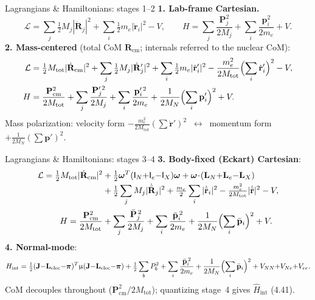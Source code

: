 \documentclass[aspectratio=169,10pt]{beamer}
\newcommand{\Mmu}{\upmu}        %
\newcommand{\stagenum}{0}
\newcommand{\setstage}[1]{\renewcommand{\stagenum}{#1}}
\begin{document}
\begin{frame}{Lagrangians \& Hamiltonians: stages 1--2}
\setstage{4}
\small
\textbf{1. Lab-frame Cartesian.}
\begin{equation*}
\mathcal L=\sum_j\tfrac12 M_j|\dot{\mathbf R}_j|^2+\sum_i\tfrac12 m_e|\dot{\mathbf r}_i|^2-V,
\qquad
H=\sum_j\frac{\mathbf P_j^2}{2M_j}+\sum_i\frac{\mathbf p_i^2}{2m_e}+V .
\end{equation*}
\textbf{2. Mass-centered} (total CoM $\mathbf R_{\mathrm{cm}}$; internals referred to the nuclear CoM):
\begin{align*}
\mathcal L&=\tfrac12 M_{\mathrm{tot}}|\dot{\mathbf R}_{\mathrm{cm}}|^2+\sum_j\tfrac12 M_j|\dot{\mathbf R}'_j|^2+\sum_i\tfrac12 m_e|\dot{\mathbf r}'_i|^2-\frac{m_e^2}{2M_{\mathrm{tot}}}\Bigl(\sum_i\dot{\mathbf r}'_i\Bigr)^2-V,\\
H&=\frac{\mathbf P_{\mathrm{cm}}^2}{2M_{\mathrm{tot}}}+\sum_j\frac{\mathbf P_j^{\prime\,2}}{2M_j}+\sum_i\frac{\mathbf p_i^{\prime\,2}}{2m_e}+\frac{1}{2M_N}\Bigl(\sum_i\mathbf p'_i\Bigr)^2+V .
\end{align*}
\centering\footnotesize Mass polarization: velocity form $-\tfrac{m_e^2}{2M_{\mathrm{tot}}}(\sum\dot{\mathbf r}')^2$ $\ \leftrightarrow\ $ momentum form $+\tfrac{1}{2M_N}(\sum\mathbf p')^2$.
\end{frame}

\begin{frame}{Lagrangians \& Hamiltonians: stages 3--4}
\setstage{4}
\footnotesize
\textbf{3. Body-fixed (Eckart) Cartesian}:
\begin{align*}
\mathcal L=\tfrac12 M_{\mathrm{tot}}|\dot{\mathbf R}_{\mathrm{cm}}|^2
&+\tfrac12\boldsymbol\omega^{T}(\mathsf I_N{+}\mathsf I_e{-}\mathsf I_X)\boldsymbol\omega
+\boldsymbol\omega\!\cdot\!(\mathbf L_N{+}\mathbf L_e{-}\mathbf L_X)\\[-1pt]
&+\tfrac12\sum_j M_j|\dot{\bar{\mathbf R}}_j|^2+\tfrac{m_e}{2}\sum_i|\dot{\bar{\mathbf r}}_i|^2-\tfrac{m_e^2}{2M_{\mathrm{tot}}}|\dot{\bar{\mathbf r}}|^2-V,\\[1pt]
H=\frac{\mathbf P_{\mathrm{cm}}^2}{2M_{\mathrm{tot}}}
&+\sum_j\frac{\bar{\mathbf P}_j^{\,2}}{2M_j}+\sum_i\frac{\bar{\mathbf p}_i^{\,2}}{2m_e}+\frac{1}{2M_N}\Bigl(\sum_i\bar{\mathbf p}_i\Bigr)^2+V .
\end{align*}
\textbf{4. Normal-mode}:
\begin{equation*}
H_{\mathrm{int}}=\tfrac12(\mathbf J{-}\mathbf L_{\mathrm{elec}}{-}\boldsymbol\pi)^{T}\Mmu(\mathbf J{-}\mathbf L_{\mathrm{elec}}{-}\boldsymbol\pi)+\tfrac12\sum_b P_b^2+\sum_i\frac{\bar{\mathbf p}_i^{\,2}}{2m_e}+\frac{1}{2M_N}\Bigl(\sum_i\bar{\mathbf p}_i\Bigr)^2+V_{NN}{+}V_{Ne}{+}V_{ee} .
\end{equation*}
\centering\footnotesize CoM decouples throughout ($\mathbf P_{\mathrm{cm}}^2/2M_{\mathrm{tot}}$); quantizing stage~4 gives $\hat H_{\mathrm{int}}$ (4.41).
\end{frame}
\end{document}
